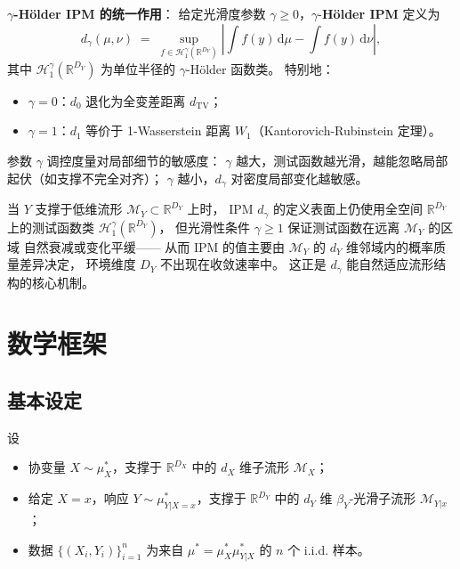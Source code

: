 \textbf{$\gamma$-Hölder IPM 的统一作用}：
给定光滑度参数 $\gamma \geq 0$，$\gamma$-\textbf{Hölder IPM} 定义为
\begin{equation}\label{eq:gamma-holder-ipm}
    d_\gamma(\mu, \nu) \;=\; \sup_{f \in \mathcal{H}_1^\gamma(\mathbb{R}^{D_Y})}
    \left|\int f(y)\,\mathrm{d}\mu - \int f(y)\,\mathrm{d}\nu\right|,
\end{equation}
其中 $\mathcal{H}_1^\gamma(\mathbb{R}^{D_Y})$ 为单位半径的 $\gamma$-Hölder 函数类。
特别地：
\begin{itemize}
    \item $\gamma = 0$：$d_0$ 退化为全变差距离 $d_{\mathrm{TV}}$；
    \item $\gamma = 1$：$d_1$ 等价于 1-Wasserstein 距离 $W_1$（Kantorovich-Rubinstein 定理）。
\end{itemize}
参数 $\gamma$ 调控度量对局部细节的敏感度：
$\gamma$ 越大，测试函数越光滑，越能忽略局部起伏（如支撑不完全对齐）；
$\gamma$ 越小，$d_\gamma$ 对密度局部变化越敏感。

\begin{Remark}\label{rem:ipm-manifold-adapt}
    当 $Y$ 支撑于低维流形 $\mathcal{M}_Y \subset \mathbb{R}^{D_Y}$ 上时，
    IPM $d_\gamma$ 的定义表面上仍使用全空间 $\mathbb{R}^{D_Y}$ 上的测试函数类
    $\mathcal{H}_1^\gamma(\mathbb{R}^{D_Y})$，
    但光滑性条件 $\gamma \geq 1$ 保证测试函数在远离 $\mathcal{M}_Y$ 的区域
    自然衰减或变化平缓——
    从而 IPM 的值主要由 $\mathcal{M}_Y$ 的 $d_Y$ 维邻域内的概率质量差异决定，
    环境维度 $D_Y$ 不出现在收敛速率中。
    这正是 $d_\gamma$ 能自然适应流形结构的核心机制。
\end{Remark}

\section{数学框架}\label{sec:ch2-framework}

\subsection{基本设定}\label{sec:ch2-setup}

设
\begin{itemize}
    \item 协变量 $X \sim \mu^*_X$，支撑于 $\mathbb{R}^{D_X}$ 中的 $d_X$ 维子流形
          $\mathcal{M}_X$；
    \item 给定 $X=x$，响应 $Y \sim \mu^*_{Y|X=x}$，支撑于 $\mathbb{R}^{D_Y}$ 中的
          $d_Y$ 维 $\beta_Y$-光滑子流形 $\mathcal{M}_{Y|x}$；
    \item 数据 $\{(X_i, Y_i)\}_{i=1}^n$ 为来自 $\mu^* = \mu^*_X \mu^*_{Y|X}$
          的 $n$ 个 i.i.d. 样本。
\end{itemize}

